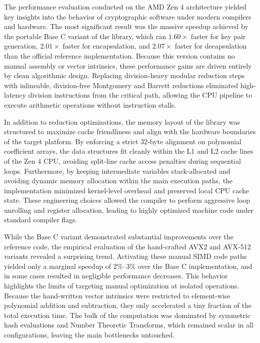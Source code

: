 The performance evaluation conducted on the AMD Zen 4 architecture yielded key insights into the behavior of cryptographic software under modern compilers and hardware. The most significant result was the massive speedup achieved by the portable Base C variant of the library, which ran $1.60\times$ faster for key pair generation, $2.01\times$ faster for encapsulation, and $2.07\times$ faster for decapsulation than the official reference implementation. Because this version contains no manual assembly or vector intrinsics, these performance gains are driven entirely by clean algorithmic design. Replacing division-heavy modular reduction steps with inlineable, division-free Montgomery and Barrett reductions eliminated high-latency division instructions from the critical path, allowing the CPU pipeline to execute arithmetic operations without instruction stalls.

In addition to reduction optimizations, the memory layout of the library was structured to maximize cache friendliness and align with the hardware boundaries of the target platform. By enforcing a strict 32-byte alignment on polynomial coefficient arrays, the data structures fit cleanly within the L1 and L2 cache lines of the Zen 4 CPU, avoiding split-line cache access penalties during sequential loops. Furthermore, by keeping intermediate variables stack-allocated and avoiding dynamic memory allocation within the main execution paths, the implementation minimized kernel-level overhead and preserved local CPU cache state. These engineering choices allowed the compiler to perform aggressive loop unrolling and register allocation, leading to highly optimized machine code under standard compiler flags.

While the Base C variant demonstrated substantial improvements over the reference code, the empirical evaluation of the hand-crafted AVX2 and AVX-512 variants revealed a surprising trend. Activating these manual SIMD code paths yielded only a marginal speedup of $2\%\text{--}3\%$ over the Base C implementation, and in some cases resulted in negligible performance decreases. This behavior highlights the limits of targeting manual optimization at isolated operations. Because the hand-written vector intrinsics were restricted to element-wise polynomial addition and subtraction, they only accelerated a tiny fraction of the total execution time. The bulk of the computation was dominated by symmetric hash evaluations and Number Theoretic Transforms, which remained scalar in all configurations, leaving the main bottlenecks untouched.

